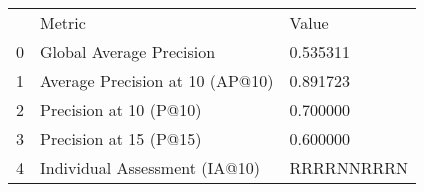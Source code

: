 \begin{tabular}{lll}
 & Metric & Value \\
0 & Global Average Precision & 0.535311 \\
1 & Average Precision at 10 (AP@10) & 0.891723 \\
2 & Precision at 10 (P@10) & 0.700000 \\
3 & Precision at 15 (P@15) & 0.600000 \\
4 & Individual Assessment (IA@10) & RRRRNNRRRN \\
\end{tabular}
